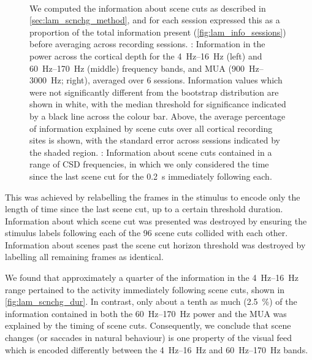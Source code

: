 \begin{figure}[htbp]
\centering
{}
\\
%
\caption{
We computed the information about scene cuts as described in \autoref{sec:lam_scnchg_method}, and for each session expressed this as a proportion of the total information present (\autoref{fig:lam_info_sessions}) before averaging across recording sessions.
\protect{}: Information in the power across the cortical depth for the \SIrange{4}{16}{Hz} (left) and \SIrange{60}{170}{Hz} (middle) frequency bands, and \ac{MUA} (\SIrange{900}{3000}{Hz}; right), averaged over \num{6} sessions.
Information values which were not significantly different from the bootstrap distribution are shown in white, with the median threshold for significance indicated by a black line across the colour bar.
Above, the average percentage of information explained by scene cuts over all cortical recording sites is shown, with the standard error across sessions indicated by the shaded region.
\protect{}: Information about scene cuts contained in a range of \ac{CSD} frequencies, in which we only considered the time since the last scene cut for the \SI{0.2}{\second} immediately following each.
}%
\label{fig:lam_scnchg}
%
\end{figure}

This was achieved by relabelling the frames in the stimulus to encode only the length of time since the last scene cut, up to a certain threshold duration.
Information about which scene cut was presented was destroyed by ensuring the stimulus labels following each of the \num{96} scene cuts collided with each other.
Information about scenes past the scene cut horizon threshold was destroyed by labelling all remaining frames as identical.

We found that approximately a quarter of the information in the \SIrange{4}{16}{Hz} range pertained to the activity immediately following scene cuts, shown in \autoref{fig:lam_scnchg_dur}.
In contrast, only about a tenth as much (\SI{2.5}{\percent}) of the information contained in both the \SIrange{60}{170}{Hz} power and the \ac{MUA} was explained by the timing of scene cuts.
Consequently, we conclude that scene changes (or saccades in natural behaviour) is one property of the visual feed which is encoded differently between the \SIrange{4}{16}{Hz} and \SIrange{60}{170}{Hz} bands.

